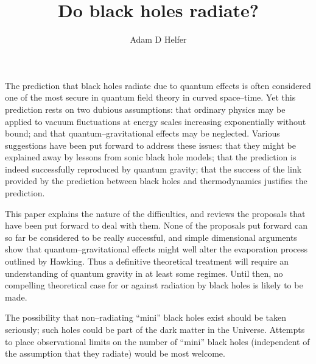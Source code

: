 \def\fnote#1{\global\advance\FEET by 1\footnote{${}^{\the\FEET}$}{#1}} %
\def\ignore#1{\relax}                                                  %
\pptstyle
\title{Do black holes radiate?}

\author{Adam D Helfer}

\address{Department of Mathematics, Mathematical Sciences Building, 
University of Missouri, Columbia, Missouri 65211, U.S.A.}



\beginabstract
The prediction that black holes radiate due to quantum effects is often
considered one of the most secure in quantum field theory in curved
space--time.  Yet this prediction rests on two dubious assumptions:  that
ordinary physics may be applied to vacuum fluctuations at energy scales
increasing exponentially without bound; and that quantum--gravitational effects
may be neglected.  Various suggestions have been put forward to address these
issues:  that they might be explained away by lessons from sonic black hole
models; that the prediction is indeed successfully reproduced by quantum
gravity; that the success of the link provided by the prediction between black
holes and thermodynamics justifies the prediction.

\cabs
This paper explains the nature of the difficulties, and reviews the proposals
that have been put forward to deal with them.   None of the proposals put
forward can so far be considered to be really successful, and simple
dimensional arguments show that quantum--gravitational effects might well alter
the evaporation process outlined by Hawking.   Thus a definitive theoretical
treatment will require an understanding of quantum gravity in at least some
regimes.  Until then, no compelling theoretical case for or against radiation
by black holes is likely to be made.

\cabs
The possibility that non--radiating ``mini'' black holes exist should be taken
seriously; such holes could be part of the dark matter in the Universe.
Attempts to place observational limits on the number of ``mini'' black holes
(independent of the assumption that they radiate) would be most welcome.
\endabstract

